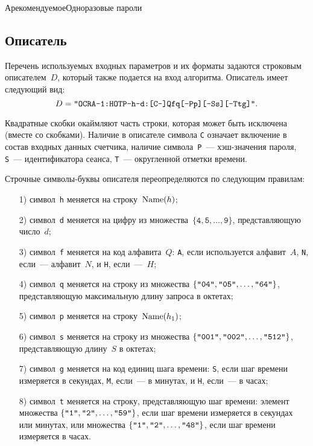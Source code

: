 \begin{appendix}{А}{рекомендуемое}{Одноразовые пароли}
\subsection{Описатель}

Перечень используемых входных параметров и их форматы задаются 
строковым описателем~$D$, который также подается на вход алгоритма.
%
Описатель имеет следующий вид:
$$
D=\texttt{\textquotedbl 
OCRA-1:HOTP-h-d:[C-]Qfq[-Pp][-Ss][-Ttg]\textquotedbl}.
$$

Квадратные скобки окаймляют часть строки, которая может быть 
исключена (вместе со скобками).
Наличие в описателе символа \texttt{C} означает включение в состав входных данных 
счетчика, наличие символа~\texttt{P}~--- хэш-значения пароля,
\texttt{S}~--- идентификатора сеанса, \texttt{T}~---
округленной отметки времени.

Строчные символы-буквы описателя переопределяются по следующим правилам:
%
\begin{itemize}
\item[1)]
символ~\texttt{h} меняется на строку~$\text{Name}(h)$;
\item[2)]
символ~\texttt{d} меняется на цифру из 
множества~$\{\texttt{4},\texttt{5},\ldots,\texttt{9}\}$,  
представляющую число~$d$;
\item[3)]
символ~\texttt{f} меняется на код алфавита~$Q$:
\texttt{A}, если используется алфавит~$A$, 
\texttt{N}, если~--- алфавит~$N$, и \texttt{H}, если~---~$H$;
\item[4)]
символ~\texttt{q} меняется на строку из множества 
$\{\texttt{\textquotedbl 04\textquotedbl},
\texttt{\textquotedbl 05\textquotedbl},\ldots,
\texttt{\textquotedbl 64\textquotedbl}\}$,
представляющую максимальную длину запроса в октетах;
\item[5)]
символ~\texttt{p} меняется на строку~$\text{Name}(h_1)$;
\item[6)]
символ~\texttt{s} меняется на строку из множества
$\{\texttt{\textquotedbl 001\textquotedbl},
\texttt{\textquotedbl 002\textquotedbl},\ldots,
\texttt{\textquotedbl 512\textquotedbl}\}$,
представляющую длину~$S$ в октетах;
\item[7)]
символ~\texttt{g} меняется на код единиц шага времени:
\texttt{S}, если шаг времени измеряется в секундах, 
\texttt{M}, если~--- в минутах, и \texttt{H}, если~--- в часах;
\item[8)]
символ~\texttt{t} меняется на строку,
представляющую шаг времени:
элемент множества 
$\{\texttt{\textquotedbl 1\textquotedbl},
\texttt{\textquotedbl 2\textquotedbl},\ldots,
\texttt{\textquotedbl 59\textquotedbl}\}$,
если шаг времени измеряется в секундах или минутах,
или множества $\{\texttt{\textquotedbl 1\textquotedbl},
\texttt{\textquotedbl 2\textquotedbl},\ldots,
\texttt{\textquotedbl 48\textquotedbl}\}$,
если шаг времени измеряется в часах.
\end{itemize}


\end{appendix}
